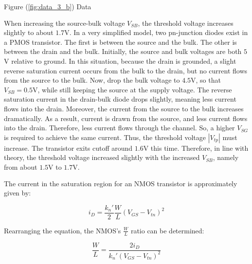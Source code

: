 \FloatBarrier

\FloatBarrier

\begin{table}[h!]
	\centering
	\caption{Figure (\ref{fig:data_3_b}) Data}
	\label{tab:data_3_b}
\end{table}

\FloatBarrier

When increasing the source-bulk voltage $V_{SB}$, the threshold voltage increases slightly to about $1.7$\si{\volt}.
In a very simplified model, two pn-junction diodes exist in a PMOS transistor.
The first is between the source and the bulk.
The other is between the drain and the bulk.
Initially, the source and bulk voltages are both $5$\si{\volt} relative to ground.
In this situation, because the drain is grounded, a slight reverse saturation current occurs from the bulk to the drain, but no current flows from the source to the bulk.
Now, drop the bulk voltage to $4.5$\si{\volt}, so that $V_{SB} = 0.5$\si{\volt}, while still keeping the source at the supply voltage.
The reverse saturation current in the drain-bulk diode drops slightly, meaning less current flows into the drain.
Moreover, the current from the source to the bulk increases dramatically.
As a result, current is drawn from the source, and less current flows into the drain.
Therefore, less current flows through the channel.
So, a higher $V_{SG}$ is required to achieve the same current.
Thus, the threshold voltage $|V_{tp}|$ must increase.
The transistor exits cutoff around $1.6$\si{\volt} this time.
Therefore, in line with theory, the threshold voltage increased slightly with the increased $V_{SB}$, namely from about $1.5$\si{\volt} to $1.7$\si{\volt}.


The current in the saturation region for an NMOS transistor is approximately given by:

\begin{equation}
	\label{eq:nmos_sat}
	i_{D} = \frac{k_{n}'}{2} \frac{W}{L} ( V_{GS} - V_{tn} )^{2}
\end{equation}

Rearranging the equation, the NMOS's $\frac{W}{L}$ ratio can be determined:

\begin{equation}
	\label{eq:w_over_l_nmos}
	\frac{W}{L} = \frac{2 i_{D}}{k_{n}' (V_{GS} - V_{tn})^{2}}
\end{equation}

